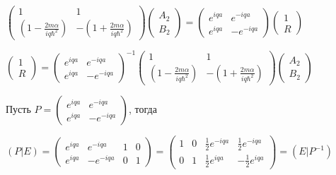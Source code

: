 \documentclass[a4paper, 12pt]{article}
\begin{document}
	\begin{center}
		$\left(\begin{array}{cc}
			1 & 1 \\
			\left(1 - \frac{2m\alpha}{iq\hbar^2}\right) & -\left(1 + \frac{2m\alpha}{iq\hbar^2}\right) 
		\end{array}\right) \left(\begin{array}{c}
			A_2 \\
			B_2
		\end{array} \right) = \left(\begin{array}{cc}
			e^{iqa} & e^{-iqa} \\
			e^{iqa} & -e^{-iqa} 
		\end{array}\right) \left(\begin{array}{c}
			1 \\
			R
		\end{array}\right)$
		
		
		$\left(\begin{array}{c}
			1 \\
			R
		\end{array}\right) =  \left(\begin{array}{cc}
			e^{iqa} & e^{-iqa} \\
			e^{iqa} & -e^{-iqa} 
		\end{array}\right)^{-1}\left(\begin{array}{cc}
			1 & 1 \\
			\left(1 - \frac{2m\alpha}{iq\hbar^2}\right) & -\left(1 + \frac{2m\alpha}{iq\hbar^2}\right) 
		\end{array}\right) \left(\begin{array}{c}
			A_2 \\
			B_2
		\end{array} \right) $
		
		Пусть $P = \left(\begin{array}{cc}
			e^{iqa} & e^{-iqa} \\
			e^{iqa} & -e^{-iqa} 
		\end{array}\right)$, тогда 
		
		$(P|E) = \left(\begin{array}{cc|cc}
			e^{iqa} & e^{-iqa} & 1 & 0 \\
			e^{iqa} & -e^{-iqa} & 0 & 1
		\end{array}\right) = \left(\begin{array}{cc|cc}
			1 & 0 & \frac{1}{2}e^{-iqa} & \frac{1}{2}e^{-iqa} \\
			0 & 1 & \frac{1}{2}e^{iqa} & -\frac{1}{2}e^{iqa}
		\end{array}\right) = (E|P^{-1})$
		

\end{center}
\end{document}
